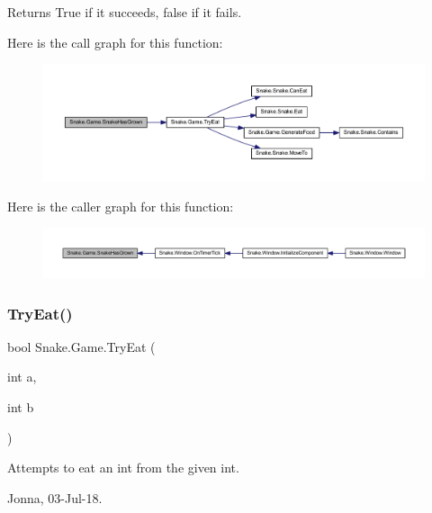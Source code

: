 \begin{DoxyReturn}{Returns}
True if it succeeds, false if it fails. 
\end{DoxyReturn}
Here is the call graph for this function\+:
\nopagebreak
\begin{figure}[H]
\begin{center}
\leavevmode
\includegraphics[width=350pt]{d5/d72/class_snake_1_1_game_a923f13e9e2c28d914b83cf28fcb2c7a3_cgraph}
\end{center}
\end{figure}
Here is the caller graph for this function\+:
\nopagebreak
\begin{figure}[H]
\begin{center}
\leavevmode
\includegraphics[width=350pt]{d5/d72/class_snake_1_1_game_a923f13e9e2c28d914b83cf28fcb2c7a3_icgraph}
\end{center}
\end{figure}
\mbox{\label{class_snake_1_1_game_a5efcd7d64d49bc7f068f2eaae008d085}} 
\subsubsection{\texorpdfstring{Try\+Eat()}{TryEat()}}
{\footnotesize\ttfamily bool Snake.\+Game.\+Try\+Eat (\begin{DoxyParamCaption}\item[{int}]{a,  }\item[{int}]{b }\end{DoxyParamCaption})\hspace{0.3cm}{\ttfamily [private]}}



Attempts to eat an int from the given int. 

Jonna, 03-\/\+Jul-\/18. 



